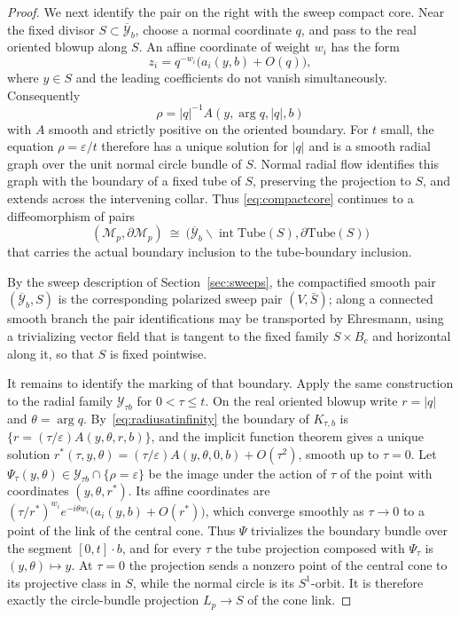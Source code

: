 \documentclass[11pt]{amsart}
\theoremstyle{definition}
\theoremstyle{remark}
\theoremstyle{plain}
\newcommand{\Mil}{\mathcal{M}}  %
\newcommand{\Sb}{\bar{S}}
\begin{document}
\begin{proof}
We next identify the pair on the right with the sweep compact core.
Near the fixed divisor $S\subset\overline{\mathcal Y}_b$, choose a
normal coordinate $q$, and pass to the real oriented blowup along
$S$.  An affine coordinate of weight $w_i$ has the form
\[
 z_i=q^{-w_i}\bigl(a_i(y,b)+O(q)\bigr),
\]
where $y\in S$ and the leading coefficients do not vanish
simultaneously.  Consequently
\begin{equation}\label{eq:radiusatinfinity}
 \rho=|q|^{-1}A(y,\arg q,|q|,b)
\end{equation}
with $A$ smooth and strictly positive on the oriented boundary.  For
$t$ small, the equation $\rho=\varepsilon/t$ therefore has a unique
solution for $|q|$ and is a smooth radial graph over the unit normal
circle bundle of $S$.  Normal radial flow identifies this graph with
the boundary of a fixed tube of $S$, preserving the projection to
$S$, and extends across the intervening collar.  Thus
\eqref{eq:compactcore} continues to a diffeomorphism of pairs
\[
 (\Mil_p,\partial \Mil_p)\ \cong\
 \bigl(\overline{\mathcal Y}_b\smallsetminus
       \operatorname{int}\mathrm{Tube}(S),
       \partial\mathrm{Tube}(S)\bigr)
\]
that carries the actual boundary inclusion to the tube-boundary
inclusion.

By the sweep description of Section~\ref{sec:sweeps}, the compactified
smooth pair $(\overline{\mathcal Y}_b,S)$ is the corresponding
polarized sweep pair $(V,\Sb)$; along a connected smooth branch the
pair identifications may be transported by Ehresmann, using a
trivializing vector field that is tangent to the fixed family
$S\times B_c$ and horizontal along it, so that $S$ is fixed pointwise.

It remains to identify the marking of that boundary.  Apply the same
construction to the radial family $\mathcal Y_{\tau b}$ for
$0<\tau\leq t$.  On the real oriented blowup write $r=|q|$ and
$\theta=\arg q$.  By~\eqref{eq:radiusatinfinity} the boundary of
$K_{\tau,b}$ is $\{r=(\tau/\varepsilon)A(y,\theta,r,b)\}$, and the implicit
function theorem gives a unique solution
$r^*(\tau,y,\theta)=(\tau/\varepsilon)A(y,\theta,0,b)+O(\tau^2)$, smooth up to
$\tau=0$.  Let $\Psi_\tau(y,\theta)\in\mathcal Y_{\tau b}\cap\{\rho=\varepsilon\}$
be the image under the action of $\tau$ of the point with coordinates
$(y,\theta,r^*)$.  Its affine coordinates are
$(\tau/r^*)^{w_i}e^{-i\theta w_i}\bigl(a_i(y,b)+O(r^*)\bigr)$, which converge
smoothly as $\tau\to0$ to a point of the link of the central cone.  Thus
$\Psi$ trivializes the boundary bundle over the segment $[0,t]\cdot b$, and
for every $\tau$ the tube projection composed with $\Psi_\tau$ is
$(y,\theta)\mapsto y$.  At $\tau=0$ the projection sends a nonzero point
of the central cone to its projective class in $S$, while the normal
circle is its $S^1$-orbit.  It is therefore exactly the circle-bundle
projection $L_p\to S$ of the cone link.


\end{proof}
\end{document}
